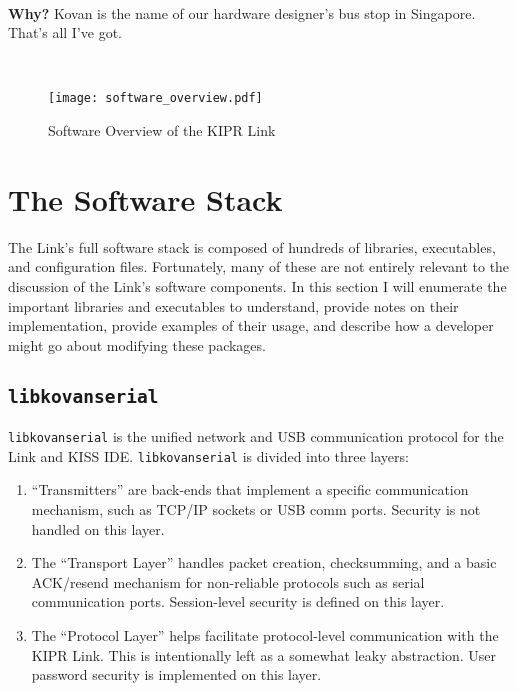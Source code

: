 \documentclass[12pt,letterpaper]{article}
\newcommand{\bcolorbox}[4]{\noindent \\ \fcolorbox{#1}{#2} {\parbox{\textwidth}{\vspace{.1em}\textbf{#3} #4\vspace{.1em}}} \\}
\newcommand{\why}[1]{\bcolorbox{black}{GhostWhite}{Why?}{#1}}
\begin{document}
	\why{Kovan is the name of our hardware designer's bus stop in Singapore. That's all I've got.}
	
	\begin{figure}[H]
		\begin{center}
			\texttt{[image: software\_overview.pdf]}
			\caption{Software Overview of the KIPR Link}
		\end{center}
	\end{figure}
	
	\section{The Software Stack}
	
	The Link's full software stack is composed of hundreds of libraries, executables, and configuration files. Fortunately, many of these
	are not entirely relevant to the discussion of the Link's software components. In this section I will enumerate the important libraries
	and executables to understand, provide notes on their implementation, provide examples of their usage, and describe how a developer
	might go about modifying these packages.
	
	\subsection{\texttt{libkovanserial}}
	\texttt{libkovanserial} is the unified network and USB communication protocol for the Link and KISS IDE.
	\texttt{libkovanserial} is divided into three layers:
	\begin{enumerate}
		\setlength{\itemsep}{0em}
		\item ``Transmitters'' are back-ends that implement a specific communication mechanism, such as TCP/IP sockets or USB comm ports.
		Security is not handled on this layer.
		\item The ``Transport Layer'' handles packet creation, checksumming, and a basic ACK/resend mechanism for non-reliable protocols such
		as serial communication ports. Session-level security is defined on this layer.
		\item The ``Protocol Layer'' helps facilitate protocol-level communication with the KIPR Link. This is intentionally left
		as a somewhat leaky abstraction. User password security is implemented on this layer.
	\end{enumerate}
	
\end{document}
